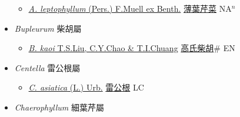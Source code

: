 \begin{itemize}
  \begin{itemize}
        \item[] \href{http://www.theplantlist.org/tpl1.1/search?q=Apium+leptophyllum}{\textit{A. leptophyllum} (Pers.) F.Muell ex Benth.}   \href{\detokenize{http://taibnet.sinica.edu.tw/chi/taibnet_species_list.php?T2=薄葉芹菜&T2_new_value=true&fr=y}}{薄葉芹菜} NA$^n$
  \end{itemize}
 \item[] \textit{Bupleurum} 柴胡屬
                    
  \begin{itemize}
        \item[] \href{http://www.theplantlist.org/tpl1.1/search?q=Bupleurum+kaoi}{\textit{B. kaoi} T.S.Liu, C.Y.Chao \& T.I.Chuang}   \href{\detokenize{http://taibnet.sinica.edu.tw/chi/taibnet_species_list.php?T2=高氏柴胡&T2_new_value=true&fr=y}}{高氏柴胡}\# EN
  \end{itemize}
 \item[] \textit{Centella} 雷公根屬
                    
  \begin{itemize}
        \item[] \href{http://www.theplantlist.org/tpl1.1/search?q=Centella+asiatica}{\textit{C. asiatica} (L.) Urb.}   \href{\detokenize{http://taibnet.sinica.edu.tw/chi/taibnet_species_list.php?T2=雷公根&T2_new_value=true&fr=y}}{雷公根} LC
  \end{itemize}
 \item[] \textit{Chaerophyllum} 細葉芹屬
                    

\end{itemize}
